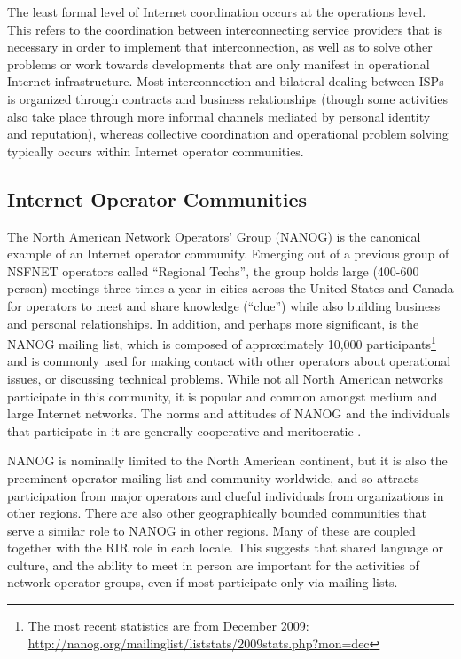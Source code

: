 The least formal level of Internet coordination occurs at the operations level.
This refers to the coordination between interconnecting service providers that
is necessary in order to implement that interconnection, as well as to solve
other problems or work towards developments that are only manifest in
operational Internet infrastructure. Most interconnection and bilateral dealing
between ISPs is organized through contracts and business relationships (though
some activities also take place through more informal channels mediated by
personal identity and reputation), whereas collective coordination and
operational problem solving typically occurs within Internet operator
communities.

\subsection{Internet Operator Communities}

The North American Network Operators' Group (NANOG) is the canonical example of
an Internet operator community. Emerging out of a previous group of NSFNET
operators called ``Regional Techs'', the group holds large (400-600 person)
meetings three times a year in cities across the United States and Canada for
operators to meet and share knowledge (``clue'') while also building business
and personal relationships. In addition, and perhaps more significant, is the
NANOG mailing list, which is composed of approximately 10,000
participants\footnote{The most recent statistics are from December 2009:
\url{http://nanog.org/mailinglist/liststats/2009stats.php?mon=dec}} and is
commonly used for making contact with other operators about operational issues,
or discussing technical problems. While not all North American networks
participate in this community, it is popular and common amongst medium and large
Internet networks. The norms and attitudes of NANOG and the individuals that
participate in it are generally cooperative and meritocratic
\cite{Mathew:2010ly}.

NANOG is nominally limited to the North American continent, but it is also the
preeminent operator mailing list and community worldwide, and so attracts
participation from major operators and clueful individuals from organizations
in other regions. There are also other geographically bounded communities that
serve a similar role to NANOG in other regions. Many of these are coupled
together with the RIR role in each locale. This suggests that shared language
or culture, and the ability to meet in person are important for
the activities of network operator groups, even if most participate only via
mailing lists.


